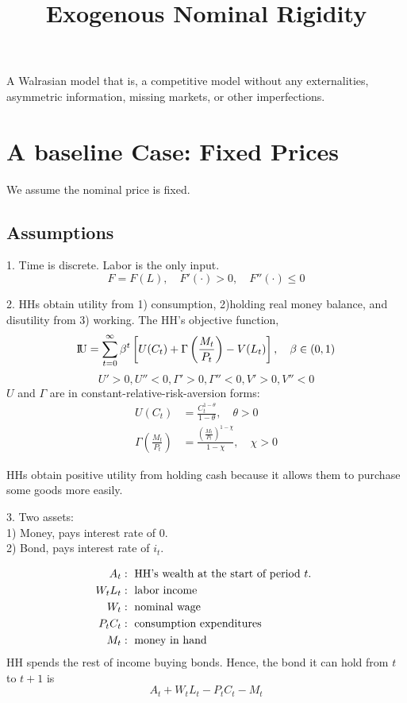 \documentclass[12pt]{article}
\title{Exogenous Nominal Rigidity}
\author{}
\date{}
\begin{document}
\maketitle

A Walrasian model that is, a competitive model without any externalities,
asymmetric information, missing markets, or other imperfections.

\section{A baseline Case: Fixed Prices}
We assume the nominal price is fixed.

\subsection{Assumptions}
1. Time is discrete. Labor is the only input.
\begin{equation*}
F = F(L), \quad F'(\cdot ) > 0, \quad F''(\cdot ) \le 0
\end{equation*}

2. HHs obtain utility from 1) consumption, 2)holding real money balance, and disutility
from 3) working.
The HH's objective function,
\begin{equation*}
{\rm I\!{U}} = \sum\limits_{t = 0} ^\infty \beta^{t}	\left[ 
		U(C_{t}) + \Gamma \left( \frac{M_{t}}{P_{t}} \right)  - V(L_{t})
\right] , \quad \beta \in (0,1)
\end{equation*}
\begin{equation*}
U' > 0, U'' < 0, \Gamma' > 0, \Gamma '' < 0, V'>0, V'' < 0
\end{equation*}
$ U $ and $ \Gamma $ are in constant-relative-risk-aversion forms:
\begin{align*}
U(C_{t}) &= \frac{C_{t}^{1 - \theta}}{1 - \theta}, \quad \theta > 0\\
\Gamma \left( \frac{M_{t}}{P_{t}} \right)  &=
\frac{\left( \frac{M_{t}}{P_{t}} \right) ^{1 - \chi}}{1 - \chi}, \quad \chi > 0
\end{align*}

HHs obtain positive utility from holding cash because it allows them to purchase some
goods more easily.


3. Two assets:\\
1) Money, pays interest rate of 0.\\
2) Bond, pays interest rate of $ i_{t} $.

\begin{align*}
A_{t}&: \text{ HH's wealth at the start of period $ t $. }\\
W_{t}L_{t}&: \text{ labor income }\\
W_{t}&: \text{ nominal wage }\\
P_{t}C_{t}&: \text{ consumption expenditures }\\
M_{t}&: \text{ money in hand }
\end{align*}
HH spends the rest of income buying bonds. Hence, the bond it can hold from $ t $
to $ t + 1 $ is
\begin{equation*}
A_{t} + W_{t}L_{t} - P_{t}C_{t} - M_{t}
\end{equation*}
\end{document}
